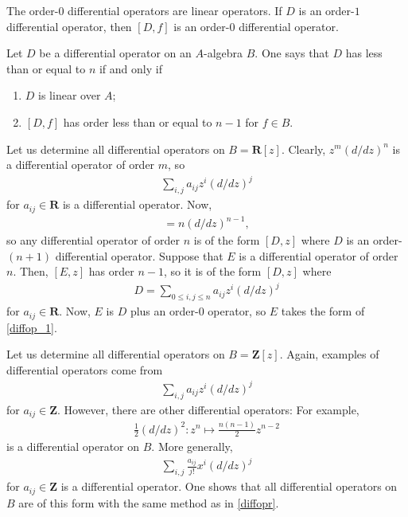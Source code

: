 \documentclass [11 pt, oneside] {article}
\begin{document}
The order-$0$ differential operators are linear operators.
If $D$ is an order-$1$ differential operator, then $[D,f]$ is an order-$0$ differential operator.

\begin{definition}[ ]\label{}\text{}
Let $D$ be a differential operator on an $A$-algebra $B$. One says that $D$ has  less than or equal to $n$ if and only if
\begin{enumerate}
	\item $D$ is linear over $A$;
	\item $[D,f]$ has order less than or equal to $n-1$ for $f\in B$.
\end{enumerate}
\end{definition}

\begin{example}[ ]\label{diffopr}\text{}
Let us determine all differential operators on $B=\mathbf{R}[z]$.
Clearly, $z^m(d/dz)^n$ is a differential operator of order $m$, so
\begin{align}\label{diffop_1}
	\sum_{i,j}^{} a_{ij}z^i(d/dz) ^j
\end{align}
for $a_{ij}\in \mathbf{R}$ is a differential operator.
Now, 
\begin{align*}
	[(d/dz) ^n,z] = n(d/dz) ^{n-1},
\end{align*}
so any differential operator of order $n$ is of the form $[D,z]$ where $D$ is an order-$(n+1)$ differential operator.
Suppose that $E$ is a differential operator of order $n$. Then, $[E,z]$ has order $n-1$, so it is of the form $[D,z]$ where 
\begin{align*}
	D = \sum_{0\le i,j\le n}^{} a_{ij}z^i(d/dz) ^j
\end{align*}
for $a_{ij}\in \mathbf{R}$.
Now, $E$ is $D$ plus an order-$0$ operator, so $E$ takes the form of \cref{diffop_1}.
\end{example}

\begin{example}[ ]\label{}\text{}
Let us determine all differential operators on $B=\mathbf{Z}[z]$.
Again, examples of differential operators come from
\begin{align*}\label{diffop_2}
	\sum_{i,j}^{} a_{ij} z^i(d/dz) ^j
\end{align*}
for $a_{ij}\in \mathbf{Z}$.
However, there are other differential operators: For example,
\begin{align*}
	\frac{1}{2}(d/dz)^2 : z^n \longmapsto \frac{n(n-1)}{2}z^{n-2}
\end{align*}
is a differential operator on $B$.
More generally,
\begin{align*}
	\sum_{i,j}^{} \frac{a_{ij}}{j!}x^i(d/dz) ^j
\end{align*}
for $a_{ij}\in \mathbf{Z}$ is a differential operator.
One shows that all differential operators on $B$ are of this form with the same method as in \cref{diffopr}.
\end{example}
\end{document}
